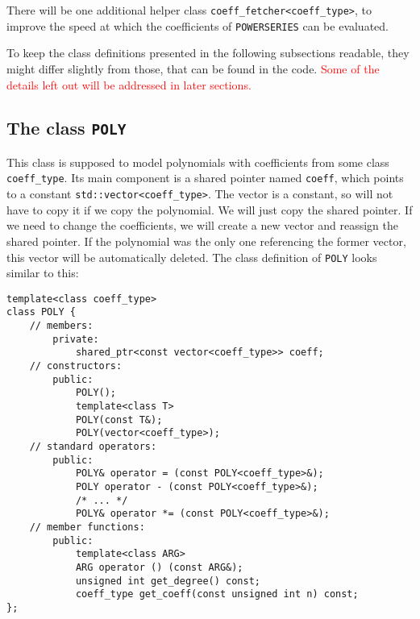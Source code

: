 \documentclass{article}
\newcommand{\code}[1]{\texttt{#1}}
\newcommand{\func}[1]{\texttt{#1}}
\newcommand{\temp}[1]{\textcolor{red}{#1}}
\begin{document}
There will be one additional helper class \func{coeff\_fetcher<coeff\_type>}, to improve the speed at which the coefficients of \func{POWERSERIES} can be evaluated.

To keep the class definitions presented in the following subsections readable, they might differ slightly from those, that can be found in the code. \temp{Some of the details left out will be addressed in later sections.}

\subsection{The class \func{POLY}}

This class is supposed to model polynomials with coefficients from some class \code{coeff\_type}. Its main component is a shared pointer named \code{coeff}, which points to a constant \code{std::vector<coeff\_type>}. The vector is a constant, so will not have to copy it if we copy the polynomial. We will just copy the shared pointer. If we need to change the coefficients, we will create a new vector and reassign the shared pointer. If the polynomial was the only one referencing the former vector, this vector will be automatically deleted. The class definition of \code{POLY} looks similar to this:

\begin{lstlisting}
template<class coeff_type>
class POLY {
	// members:
		private:
			shared_ptr<const vector<coeff_type>> coeff;
	// constructors:
		public:
			POLY();
			template<class T>
			POLY(const T&);
			POLY(vector<coeff_type>);
	// standard operators:
		public:
			POLY& operator = (const POLY<coeff_type>&);
			POLY operator - (const POLY<coeff_type>&);
			/* ... */
			POLY& operator *= (const POLY<coeff_type>&);
	// member functions:
		public:
			template<class ARG>
			ARG operator () (const ARG&);
			unsigned int get_degree() const;
			coeff_type get_coeff(const unsigned int n) const;
};
\end{lstlisting}
\end{document}
